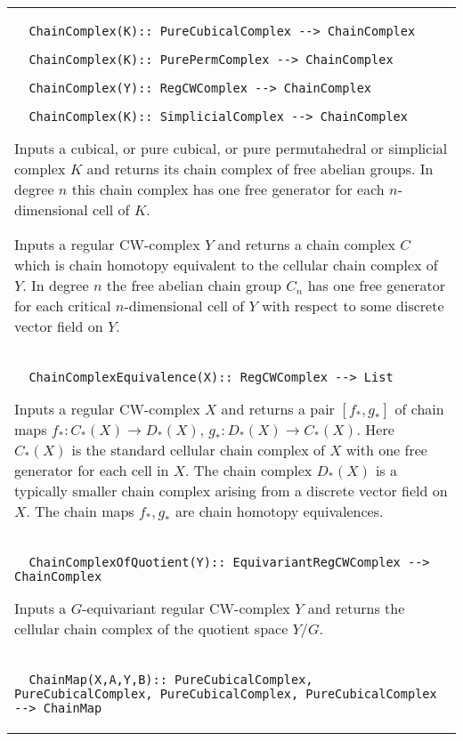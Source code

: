 \documentclass[a4paper,11pt]{report}
\begin{document}
{\begin{center}
\begin{tabular}{|l|}
\begin{verbatim}  ChainComplex(K):: PureCubicalComplex --> ChainComplex
\end{verbatim}
 
\begin{verbatim}  ChainComplex(K):: PurePermComplex --> ChainComplex
\end{verbatim}
 
\begin{verbatim}  ChainComplex(Y):: RegCWComplex --> ChainComplex
\end{verbatim}
 
\begin{verbatim}  ChainComplex(K):: SimplicialComplex --> ChainComplex
\end{verbatim}


 

 Inputs a cubical, or pure cubical, or pure permutahedral or simplicial complex $K$ and returns its chain complex of free abelian groups. In degree $n$ this chain complex has one free generator for each $n$-dimensional cell of $K$. 

 Inputs a regular CW-complex $Y$ and returns a chain complex $C$ which is chain homotopy equivalent to the cellular chain complex of $Y$. In degree $n$ the free abelian chain group $C_n$ has one free generator for each critical $n$-dimensional cell of $Y$ with respect to some discrete vector field on $Y$. \\
 \index{ChainComplexEquivalence} 
\begin{verbatim}  ChainComplexEquivalence(X):: RegCWComplex --> List
\end{verbatim}


 

 Inputs a regular CW-complex $X$ and returns a pair $[f_\ast, g_\ast]$ of chain maps $f_\ast\colon C_\ast(X) \rightarrow D_\ast(X)$, $g_\ast\colon D_\ast(X) \rightarrow C_\ast(X)$. Here $C_\ast(X)$ is the standard cellular chain complex of $X$ with one free generator for each cell in $X$. The chain complex $D_\ast(X)$ is a typically smaller chain complex arising from a discrete vector field on $X$. The chain maps $f_\ast, g_\ast$ are chain homotopy equivalences. \\
 \index{ChainComplexOfQuotient} 
\begin{verbatim}  ChainComplexOfQuotient(Y):: EquivariantRegCWComplex --> ChainComplex
\end{verbatim}


 

 Inputs a $G$-equivariant regular CW-complex $Y$ and returns the cellular chain complex of the quotient space $Y/G$. \\
 \index{ChainMap} 
\begin{verbatim}  ChainMap(X,A,Y,B):: PureCubicalComplex, PureCubicalComplex, PureCubicalComplex, PureCubicalComplex --> ChainMap
\end{verbatim}
 

\end{tabular}
\end{center}}
\end{document}

